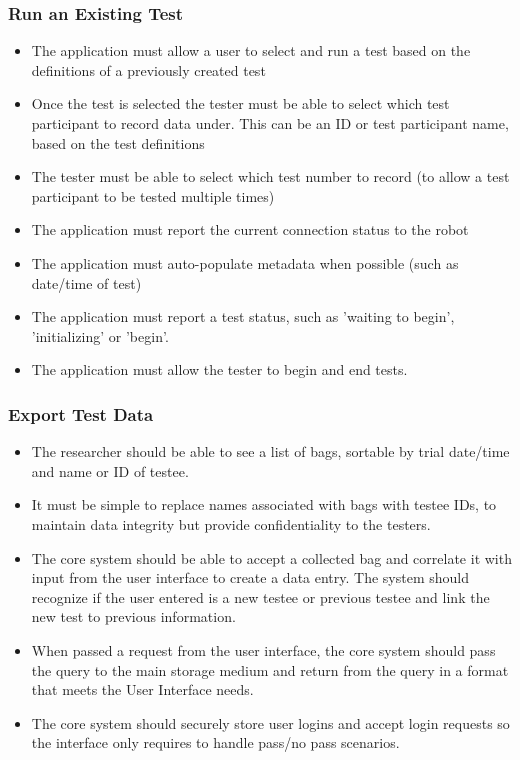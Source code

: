 \documentclass[onecolumn, draftclsnofoot,10pt, compsoc]{report}
\begin{document}
	\subsubsection{Run an Existing Test}
	\begin{itemize}
		\item The application must allow a user to select and run a test based on the definitions of a previously created test
		\item Once the test is selected the tester must be able to select which test participant to record data under. This can be an ID or test participant name, based on the test definitions
		\item The tester must be able to select which test number to record (to allow a test participant to be tested multiple times)
		\item The application must report the current connection status to the robot
		\item The application must auto-populate metadata when possible (such as date/time of test)
		\item The application must report a test status, such as 'waiting to begin', 'initializing' or 'begin'.
		\item The application must allow the tester to begin and end tests.
	\end{itemize}
	\subsubsection{Export Test Data}
	\begin{itemize}
		\item The researcher should be able to see a list of bags, sortable by trial date/time and name or ID of testee.
		\item It must be simple to replace names associated with bags with testee IDs, to maintain data integrity but provide confidentiality to the testers.
		\item The core system should be able to accept a collected bag and correlate it with input from the user interface to create a data entry.
		\subitem The system should recognize if the user entered is a new testee or previous testee and link the new test to previous information.
		\item When passed a request from the user interface, the core system should pass the query to the main storage medium and return from the query in a format that meets the User Interface needs.
		\item The core system should securely store user logins and accept login requests so the interface only requires to handle pass/no pass scenarios.
	\end{itemize}
\end{document}
